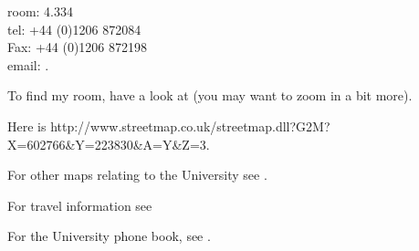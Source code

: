 \documentclass[a4paper]{article}
\begin{document}
room: 4.334\\
tel: +44 (0)1206 872084\\
Fax: +44 (0)1206 872198\\
email: .

To find my room, have a look at 
(you may want to zoom in a bit more).


Here is 
              {http://www.streetmap.co.uk/streetmap.dll?G2M?X=602766\&Y=223830\&A=Y\&Z=3}.

For other maps relating to the University see .

For travel information see 

For the University phone book, see .

%
\end{document}
